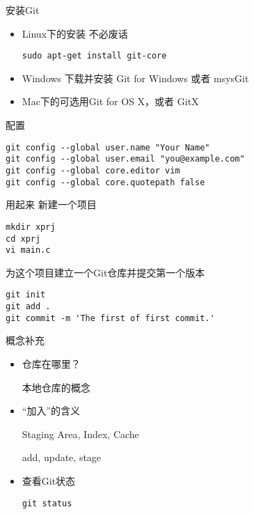 \begin{frame}[<+->][fragile]{安装Git}
\begin{itemize}
  \item Linux下的安装
  不必废话
\begin{Verbatim}[frame=single,commandchars=\\\{\}]
sudo apt-get install git-core
\end{Verbatim}

  \item Windows 下载并安装 Git for Windows 或者 msysGit

  
  \item Mac下的可选用Git for OS X，或者 GitX
\end{itemize}
\end{frame}

\begin{frame}[<+->][fragile]{配置}
\begin{Verbatim}[frame=single,commandchars=\\\{\}]
git config --global user.name "Your Name"
git config --global user.email "you@example.com"
git config --global core.editor vim
git config --global core.quotepath false
\end{Verbatim}
\end{frame}

\begin{frame}[<+->][fragile]{用起来}
\onslide<+->
新建一个项目
\begin{Verbatim}[frame=single,commandchars=\\\{\}]
mkdir xprj
cd xprj
vi main.c
\end{Verbatim}

\onslide<+->
为这个项目建立一个Git仓库并提交第一个版本
\begin{Verbatim}[frame=single,commandchars=\\\{\}]
git init
git add .
git commit -m 'The first of first commit.'
\end{Verbatim}
\end{frame}

\begin{frame}[<+->][fragile]{概念补充}
  \begin{itemize}
    \item 仓库在哪里？

    本地仓库的概念
    \item “加入”的含义

    Staging Area, Index, Cache 

    add, update, stage
    \item 查看Git状态
\begin{Verbatim}[frame=single,commandchars=\\\{\}]
git status
\end{Verbatim}

  \end{itemize}
\end{frame}



